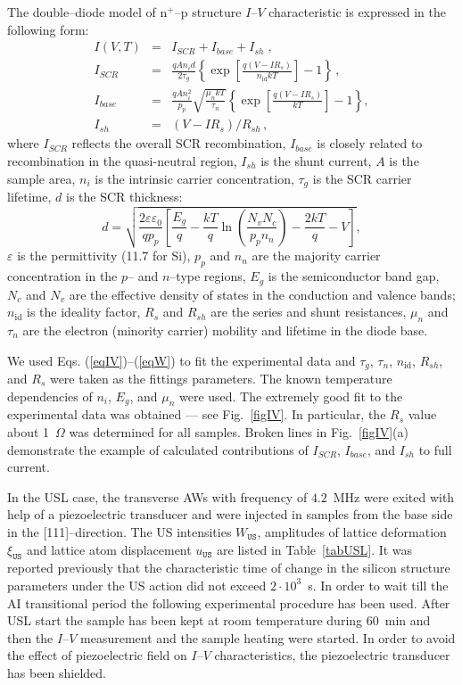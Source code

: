 \documentclass[aip,jap, amsmath,amssymb,reprint]{revtex4-1}
\begin{document}
The double--diode model of n$^+$--p structure $I$--$V$ characteristic is expressed in the following form:
\begin{eqnarray}
I(V,T)&=&I_{SCR}+I_{base}+I_{sh}\;,\label{eqIV}\\
I_{SCR}&=&\frac{qAn_id}{2\tau_{g}}\left\{\exp \left[\frac{q(V-IR_s)}{n_{\mathrm{id}}kT}\right]-1\right\}\,,\label{eqIscr}\\
I_{base}&=&\frac{qAn_i^2}{p_p}\sqrt{\frac{\mu_nkT}{\tau_n}}\left\{\exp \left[\frac{q(V-IR_s)}{kT}\right]-1\right\},\label{eqIbase}\\
I_{sh}&=&(V-IR_s)/R_{sh}\,,\label{eqIsh}
\end{eqnarray}
where
$I_{SCR}$ reflects the overall SCR recombination,
$I_{base}$ is closely related to recombination in the quasi-neutral region,
$I_{sh}$ is the shunt current,
$A$ is the sample area,
$n_i$ is the intrinsic carrier concentration,
$\tau_{g}$ is the SCR carrier lifetime,
$d$ is the  SCR thickness:
\begin{equation}
\label{eqW}
    d=\sqrt{\frac{2 \varepsilon \varepsilon_0}{q p_p}\left[
     \frac{E_g}{q}-\frac{kT}{q}\ln\!\left(\frac{N_vN_c}{p_pn_n}\right)-\frac{2kT}{q}-V\right]},
\end{equation}
$\varepsilon$ is the permittivity (11.7 for Si),
$p_p$ and $n_n$ are the majority carrier concentration in the $p$-- and $n$--type regions,
$E_g$ is the semiconductor band gap,
$N_c$ and $N_v$ are the effective density of states in the conduction and valence bands;
$n_{\mathrm{id}}$ is the ideality factor,
$R_s$ and $R_{sh}$ are the series and shunt resistances,
$\mu_n$ and $\tau_n$ are the electron (minority carrier) mobility and lifetime in the diode base.


We used Eqs. (\ref{eqIV})--(\ref{eqW}) to fit the experimental data and $\tau_g$, $\tau_n$, $n_{\mathrm{id}}$, $R_{sh}$, and $R_s$ were taken as the  fittings parameters.
The known \cite{ni:Green,Schroder2006,Markvart} temperature dependencies of $n_i$, $E_g$, and $\mu_n$ were used.
The extremely good fit to the experimental data was obtained --- see Fig.~\ref{figIV}.
In particular, the $R_s$ value about 1~$\Omega$ was determined for all samples.
Broken lines in Fig.~\ref{figIV}(a) demonstrate the example of calculated contributions of $I_{SCR}$, $I_{base}$, and $I_{sh}$ to full current.

In the USL case, the transverse AWs with frequency of $4.2$~MHz were exited with help of a piezoelectric transducer and were injected in samples from the base side in the [111]--direction.
The US intensities $W_{\mathtt{US}}$, amplitudes of lattice deformation $\xi_{\mathtt{US}}$ and lattice atom
displacement  $u_{\mathtt{US}}$ are listed in Table~\ref{tabUSL}.
It was reported previously \cite{Ostapenko1995,Olikh:Ultras,Ostrovskii2001} that the characteristic time of change in the silicon structure parameters under
the US action  did not exceed $2\cdot10^3$~s.
In order to wait till the AI transitional period the following experimental procedure has been used.
After USL start the sample has been kept at room temperature during 60~min and then the $I$--$V$ measurement and the sample heating were started.
In order to avoid the effect of piezoelectric field on $I$--$V$ characteristics, the piezoelectric transducer has been shielded.
\end{document}
